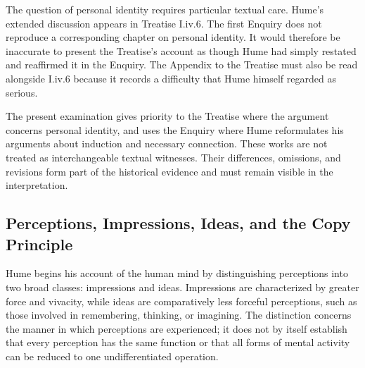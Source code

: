 \label{para:VS.B01.P01.C08.S09.SS02.P003}

The question of personal identity requires particular
textual care. Hume's extended discussion appears in
Treatise I.iv.6. The first Enquiry does not reproduce
a corresponding chapter on personal identity. It would
therefore be inaccurate to present the Treatise's account
as though Hume had simply restated and reaffirmed it in
the Enquiry. The Appendix to the Treatise must also be
read alongside I.iv.6 because it records a difficulty
that Hume himself regarded as serious.
\cite[1.4.6, SBN 251--263; Appendix, SBN 633--636]{HumeTreatise}
\cite{QuRadcliffeHume2026}

\label{para:VS.B01.P01.C08.S09.SS02.P004}

The present examination gives priority to the Treatise
where the argument concerns personal identity, and uses
the Enquiry where Hume reformulates his arguments about
induction and necessary connection. These works are not
treated as interchangeable textual witnesses. Their
differences, omissions, and revisions form part of the
historical evidence and must remain visible in the
interpretation.



\subsection{Perceptions, Impressions, Ideas, and the Copy Principle}
\label{subsec:ch08-hume-copy-principle}

\label{para:VS.B01.P01.C08.S09.SS03.P001}

Hume begins his account of the human mind by distinguishing
perceptions into two broad classes: impressions and ideas.
Impressions are characterized by greater force and
vivacity, while ideas are comparatively less forceful
perceptions, such as those involved in remembering,
thinking, or imagining. The distinction concerns the
manner in which perceptions are experienced; it does not
by itself establish that every perception has the same
function or that all forms of mental activity can be
reduced to one undifferentiated operation.
\cite[1.1.1.1--3, SBN 1--3]{HumeTreatise}

